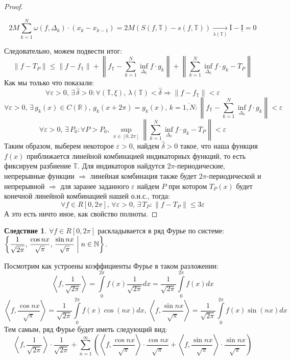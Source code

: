 \documentclass[12pt]{article}
\newcommand{\MR}{\mathbb{R}}
\newcommand{\MN}{\mathbb{N}}
\newcommand{\MTB}{\mathbb{T}}
\newcommand{\MI}{\mathrm{I}}
\newcommand{\VE}{\varepsilon}
\theoremstyle{definition}
\newtheorem{corollary}{Следствие}
\newcommand{\ddsum}[2]{\displaystyle\sum\limits_{#1}^{#2}}
\newcommand{\ddint}[2]{\displaystyle\int\limits_{#1}^{#2}}
\newcommand{\inner}[2]{\left\langle #1, #2 \right\rangle }
\begin{document}
\begin{proof}
\begin{enumerate}[label=\arabic*)]
		$$
			2M\ddsum{k = 1}{N}\omega(f,\Delta_k){\cdot}(x_{k} - x_{k-1}) = 2M (S(f,\MTB) - s(f,\MTB)) \xrightarrow[\lambda(\MTB)]{} \overline{\MI} - \underline{\MI} = 0
		$$
	\end{enumerate}
	Следовательно, можем подвести итог:
	$$
		\|f - T_P\| \leq \|f - f_{\MTB}\| + \left\|f_{\MTB} - \ddsum{k=1}{N}\inf\limits_{\Delta_k}f{\cdot}g_k\right\| + \left\|\ddsum{k=1}{N}\inf\limits_{\Delta_k}f{\cdot}g_k - T_P\right\|
	$$
	Как мы только что показали:
	$$
		\forall \VE > 0, \, \exists \, \hat{\delta} > 0 \colon \forall (\MTB,\xi), \, \lambda(\MTB) < \hat{\delta} \Rightarrow \|f - f_{\MTB}\| < \VE
	$$
	$$
		\forall \VE > 0, \, \exists \, g_k(x) \in C(\MR), \, g_k(x + 2\pi) = g_k(x), \, k = \overline{1,N} \colon \left\|f_{\MTB} - \ddsum{k=1}{N}\inf\limits_{\Delta_k}f{\cdot}g_k\right\| < \VE
	$$
	$$
		\forall \VE > 0, \, \exists \, P_0 \colon \forall P > P_0, \, \sup\limits_{x \in [0,2\pi]}\left\|\ddsum{k=1}{N}\inf\limits_{\Delta_k}f{\cdot}g_k - T_P\right\| < \VE
	$$
	Таким образом, выберем некоторое $\VE > 0$, найдем $\hat{\delta} > 0$ такое, что наша функция $f(x)$ приближается линейной комбинацией индикаторных функций, то есть фиксируем разбиение $\MTB$. Для индикаторов найдутся $2\pi$-периодические, непрерывные функции $\Rightarrow$ линейная комбинация также будет $2\pi$-периодической и непрерывной $\Rightarrow$ для заранее заданного $\VE$ найдем $P$ при котором $T_P(x)$ будет конечной линейной комбинацией нашей о.н.с., тогда:
	$$
		\forall f \in R[0,2\pi], \, \forall \VE > 0, \, \exists \, T_P \colon \|f - T_P\| \leq 3\VE
	$$
	А это есть ничто иное, как свойство полноты.
\end{proof}
\begin{corollary}
	$\forall f \in R[0,2\pi]$ раскладывается в ряд Фурье по системе: $
	\left\{\dfrac{1}{\sqrt{2\pi}}, \, \dfrac{\cos{nx}}{\sqrt{\pi}}, \, \dfrac{\sin{nx}}{\sqrt{\pi}}  \biggm\vert  n \in \MN  \right\}
	$.
\end{corollary}
Посмотрим как устроены коэффициенты Фурье в таком разложении:
$$
	\inner{f}{\dfrac{1}{\sqrt{2\pi}}} = \ddint{0}{2\pi}f(x)\dfrac{1}{\sqrt{2\pi}}dx = \dfrac{1}{\sqrt{2\pi}}\ddint{0}{2\pi}f(x)dx
$$
$$
	\inner{f}{ \dfrac{\cos{nx}}{\sqrt{\pi}}} = \dfrac{1}{\sqrt{2\pi}}\ddint{0}{2\pi}f(x)\cos{(nx)}dx, \,
	\inner{f}{ \dfrac{\sin{nx}}{\sqrt{\pi}}} = \dfrac{1}{\sqrt{2\pi}}\ddint{0}{2\pi}f(x)\sin{(nx)}dx
$$
Тем самым, ряд Фурье будет иметь следующий вид:
$$
	\inner{f}{\dfrac{1}{\sqrt{2\pi}}}{\cdot}\dfrac{1}{\sqrt{2\pi}} + \ddsum{n = 1}{\infty}\left(\inner{f}{ \dfrac{\cos{nx}}{\sqrt{\pi}}}{\cdot}\dfrac{\cos{nx}}{\sqrt{\pi}} + \inner{f}{ \dfrac{\sin{nx}}{\sqrt{\pi}}}{\cdot}\dfrac{\sin{nx}}{\sqrt{\pi}}\right)
$$
\end{document}

